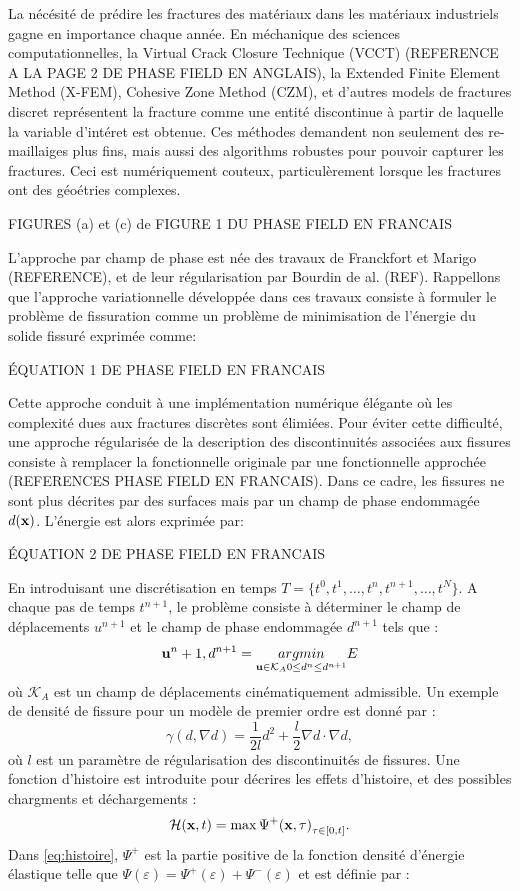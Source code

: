 La nécésité de prédire les fractures des matériaux dans les matériaux industriels gagne en importance chaque année. En méchanique des sciences computationnelles, la Virtual Crack Closure Technique (VCCT) (REFERENCE A LA PAGE 2 DE PHASE FIELD EN ANGLAIS), la Extended Finite Element Method (X-FEM), Cohesive Zone Method (CZM), et d'autres models de fractures discret représentent la fracture comme une entité discontinue à partir de laquelle la variable d'intéret est obtenue. Ces méthodes demandent non seulement des re-maillaiges plus fins, mais aussi des algorithms robustes pour pouvoir capturer les fractures. Ceci est numériquement couteux, particulèrement lorsque les fractures ont des géoétries complexes.

FIGURES (a) et (c) de FIGURE 1 DU PHASE FIELD EN FRANCAIS

L'approche par champ de phase est née des travaux de Franckfort et Marigo (REFERENCE), et de leur régularisation par Bourdin de al. (REF). Rappellons que l’approche variationnelle développée dans ces travaux consiste à formuler le problème de fissuration comme un problème de minimisation de l’énergie du solide fissuré exprimée comme:

ÉQUATION 1 DE PHASE FIELD EN FRANCAIS

Cette approche conduit à une implémentation numérique élégante où les complexité dues aux fractures discrètes sont élimiées. Pour éviter cette difficulté, une approche régularisée de la description
des discontinuités associées aux fissures consiste à remplacer la fonctionnelle originale par une fonctionnelle approchée (REFERENCES PHASE FIELD EN FRANCAIS). Dans ce cadre, les fissures ne sont plus décrites par des surfaces mais par un champ de phase endommagée $d(\bm{\mathrm{x}})$. L’énergie est alors exprimée par:

ÉQUATION 2 DE PHASE FIELD EN FRANCAIS

En introduisant une discrétisation en temps $T = \{ t^0, t^1, \ldots, t^n, t^{n+1}, \ldots, t^N \}$. A chaque pas de temps $t^{n+1}$, le problème consiste à déterminer le champ de déplacements $u^{n+1}$ et le champ de phase endommagée $d^{n+1}$ tels que :
$$
\bm{\mathrm{u}}^n+1, d^{n+1} = \underset{\bm{\mathrm{u}}\in \mathcal{K}_A \\ 0 \leq d^n \leq d^{n+1}}{argmin} E
$$
où $\mathcal{K}_A$ est un champ de déplacements cinématiquement admissible. Un exemple de densité de fissure pour un modèle de premier ordre est donné par :
$$
\gamma (d, \nabla d) = \frac{1}{2l}d^2 + \frac{l}{2}\nabla d \cdot \nabla d,
$$
où $l$ est un paramètre de régularisation des discontinuités de fissures. Une fonction d'histoire est introduite pour décrires les effets d'histoire, et des possibles chargments et déchargements \parencite{miehe2010phase}:
\begin{align}
    \label{eq:histoire}
    \mathcal{H}(\bm{\mathrm{x}}, t) = \max{\Psi^{+}(\bm{\mathrm{x}},\tau)}_{\tau \in [0,t]} .
\end{align}
Dans \cref{eq:histoire}, $\Psi^+$ est la partie positive de la fonction densité d’énergie élastique telle que $\Psi(\varepsilon) = \Psi^{+}(\varepsilon) + \Psi^{-}(\varepsilon)$
et est définie par :

